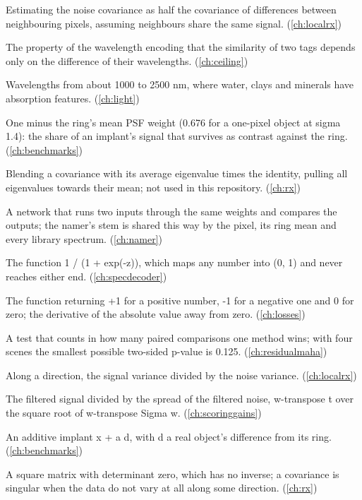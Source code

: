 \begin{description}[style=nextline,leftmargin=1.2em,font=\normalfont\bfseries]
\item[Shift difference] Estimating the noise covariance as half the covariance of differences between neighbouring pixels, assuming neighbours share the same signal. (\cref{ch:localrx})
\item[Shift invariance] The property of the wavelength encoding that the similarity of two tags depends only on the difference of their wavelengths. (\cref{ch:ceiling})
\item[Shortwave infrared (SWIR)] Wavelengths from about 1000 to 2500 nm, where water, clays and minerals have absorption features. (\cref{ch:light})
\item[Shrink] One minus the ring's mean PSF weight (0.676 for a one-pixel object at sigma 1.4): the share of an implant's signal that survives as contrast against the ring. (\cref{ch:benchmarks})
\item[Shrinkage] Blending a covariance with its average eigenvalue times the identity, pulling all eigenvalues towards their mean; not used in this repository. (\cref{ch:rx})
\item[Siamese network] A network that runs two inputs through the same weights and compares the outputs; the namer's stem is shared this way by the pixel, its ring mean and every library spectrum. (\cref{ch:namer})
\item[Sigmoid] The function 1 / (1 + exp(-z)), which maps any number into (0, 1) and never reaches either end. (\cref{ch:specdecoder})
\item[Sign function] The function returning +1 for a positive number, -1 for a negative one and 0 for zero; the derivative of the absolute value away from zero. (\cref{ch:losses})
\item[Sign test] A test that counts in how many paired comparisons one method wins; with four scenes the smallest possible two-sided p-value is 0.125. (\cref{ch:residualmaha})
\item[Signal-to-noise ratio] Along a direction, the signal variance divided by the noise variance. (\cref{ch:localrx})
\item[Signal-to-noise ratio (SNR)] The filtered signal divided by the spread of the filtered noise, w-transpose t over the square root of w-transpose Sigma w. (\cref{ch:scoringgains})
\item[Signature implant] An additive implant x + a d, with d a real object's difference from its ring. (\cref{ch:benchmarks})
\item[Singular matrix] A square matrix with determinant zero, which has no inverse; a covariance is singular when the data do not vary at all along some direction. (\cref{ch:rx})

\end{description}
